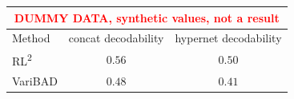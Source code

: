 \begin{tabular}{lcc}
\toprule
\multicolumn{3}{c}{\textcolor{red}{\footnotesize DUMMY DATA, synthetic values, not a result}} \\
\hline
Method & concat decodability & hypernet decodability \\
\midrule
RL\textsuperscript{2} & $0.56$ & $0.50$ \\
VariBAD & $0.48$ & $0.41$ \\
\bottomrule
\end{tabular}

